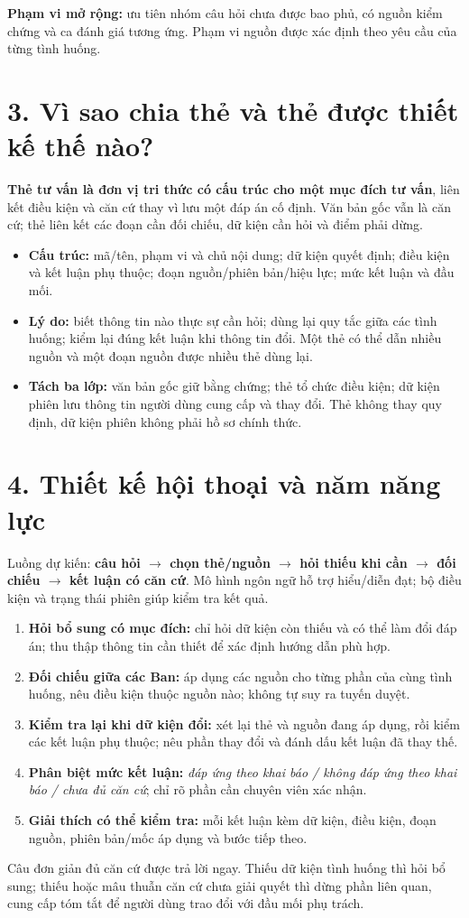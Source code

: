 \documentclass[12pt,a4paper]{article}
\begin{document}
\textbf{Phạm vi mở rộng:} ưu tiên nhóm câu hỏi chưa được bao phủ, có nguồn kiểm chứng và ca đánh giá tương ứng. Phạm vi nguồn được xác định theo yêu cầu của từng tình huống.

\section*{3. Vì sao chia thẻ và thẻ được thiết kế thế nào?}
\textbf{Thẻ tư vấn là đơn vị tri thức có cấu trúc cho một mục đích tư vấn}, liên kết điều kiện và căn cứ thay vì lưu một đáp án cố định. Văn bản gốc vẫn là căn cứ; thẻ liên kết các đoạn cần đối chiếu, dữ kiện cần hỏi và điểm phải dừng.
\begin{itemize}
\item \textbf{Cấu trúc:} mã/tên, phạm vi và chủ nội dung; dữ kiện quyết định; điều kiện và kết luận phụ thuộc; đoạn nguồn/phiên bản/hiệu lực; mức kết luận và đầu mối.
\item \textbf{Lý do:} biết thông tin nào thực sự cần hỏi; dùng lại quy tắc giữa các tình huống; kiểm lại đúng kết luận khi thông tin đổi. Một thẻ có thể dẫn nhiều nguồn và một đoạn nguồn được nhiều thẻ dùng lại.
\item \textbf{Tách ba lớp:} văn bản gốc giữ bằng chứng; thẻ tổ chức điều kiện; dữ kiện phiên lưu thông tin người dùng cung cấp và thay đổi. Thẻ không thay quy định, dữ kiện phiên không phải hồ sơ chính thức.
\end{itemize}

\newpage
\section*{4. Thiết kế hội thoại và năm năng lực}
Luồng dự kiến: \textbf{câu hỏi $\rightarrow$ chọn thẻ/nguồn $\rightarrow$ hỏi thiếu khi cần $\rightarrow$ đối chiếu $\rightarrow$ kết luận có căn cứ}. Mô hình ngôn ngữ hỗ trợ hiểu/diễn đạt; bộ điều kiện và trạng thái phiên giúp kiểm tra kết quả.
\begin{enumerate}
\item \textbf{Hỏi bổ sung có mục đích:} chỉ hỏi dữ kiện còn thiếu và có thể làm đổi đáp án; thu thập thông tin cần thiết để xác định hướng dẫn phù hợp.
\item \textbf{Đối chiếu giữa các Ban:} áp dụng các nguồn cho từng phần của cùng tình huống, nêu điều kiện thuộc nguồn nào; không tự suy ra tuyến duyệt.
\item \textbf{Kiểm tra lại khi dữ kiện đổi:} xét lại thẻ và nguồn đang áp dụng, rồi kiểm các kết luận phụ thuộc; nêu phần thay đổi và đánh dấu kết luận đã thay thế.
\item \textbf{Phân biệt mức kết luận:} \emph{đáp ứng theo khai báo / không đáp ứng theo khai báo / chưa đủ căn cứ}; chỉ rõ phần cần chuyên viên xác nhận.
\item \textbf{Giải thích có thể kiểm tra:} mỗi kết luận kèm dữ kiện, điều kiện, đoạn nguồn, phiên bản/mốc áp dụng và bước tiếp theo.
\end{enumerate}
Câu đơn giản đủ căn cứ được trả lời ngay. Thiếu dữ kiện tình huống thì hỏi bổ sung; thiếu hoặc mâu thuẫn căn cứ chưa giải quyết thì dừng phần liên quan, cung cấp tóm tắt để người dùng trao đổi với đầu mối phụ trách.
\end{document}
